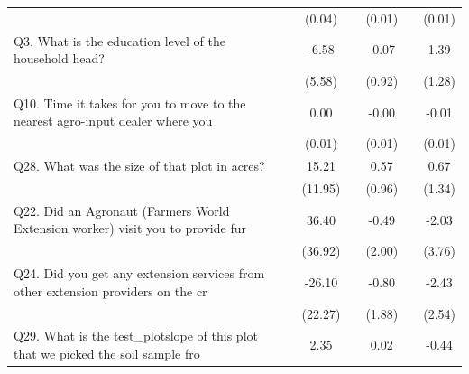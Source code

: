 {\begin{tabular}{l*{6}{c}}
                    &                     &      (0.04)         &                     &      (0.01)         &                     &      (0.01)         \\
[1em]
Q3. What is the education level of the household head?&                     &       -6.58         &                     &       -0.07         &                     &        1.39         \\
                    &                     &      (5.58)         &                     &      (0.92)         &                     &      (1.28)         \\
[1em]
Q10. Time it takes for you to move  to  the nearest agro-input dealer where you &                     &        0.00         &                     &       -0.00         &                     &       -0.01         \\
                    &                     &      (0.01)         &                     &      (0.01)         &                     &      (0.01)         \\
[1em]
Q28. What was the size of that  plot in acres?&                     &       15.21         &                     &        0.57         &                     &        0.67         \\
                    &                     &     (11.95)         &                     &      (0.96)         &                     &      (1.34)         \\
[1em]
Q22. Did an Agronaut  (Farmers World Extension worker)  visit you to provide fur&                     &       36.40         &                     &       -0.49         &                     &       -2.03         \\
                    &                     &     (36.92)         &                     &      (2.00)         &                     &      (3.76)         \\
[1em]
Q24. Did you get any extension services from other extension providers on the cr&                     &      -26.10         &                     &       -0.80         &                     &       -2.43         \\
                    &                     &     (22.27)         &                     &      (1.88)         &                     &      (2.54)         \\
[1em]
Q29. What is the test\_plotslope of this  plot that we picked the soil sample fro&                     &        2.35         &                     &        0.02         &                     &       -0.44         \\

\end{tabular}}

